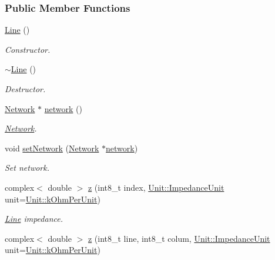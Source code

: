 \subsubsection*{Public Member Functions}
\begin{DoxyCompactItemize}
\item 
\hyperlink{group___models_gacc11b8a429d8cdd63ba6803dff5602b3}{Line} ()
\begin{DoxyCompactList}\small\item\em Constructor. \end{DoxyCompactList}\item 
\hyperlink{group___models_gaabe85f48d22d92b62257091f48174fac}{$\sim$\+Line} ()
\begin{DoxyCompactList}\small\item\em Destructor. \end{DoxyCompactList}\item 
\hyperlink{class_network}{Network} $\ast$ \hyperlink{group___models_gaa4cfa330c9c53ddaf86c8f5c17ba1ee0}{network} ()
\begin{DoxyCompactList}\small\item\em \hyperlink{class_network}{Network}. \end{DoxyCompactList}\item 
void \hyperlink{group___models_ga320766e09f0ea36b2dd07d3b1db1b72e}{set\+Network} (\hyperlink{class_network}{Network} $\ast$\hyperlink{group___models_gaa4cfa330c9c53ddaf86c8f5c17ba1ee0}{network})
\begin{DoxyCompactList}\small\item\em Set network. \end{DoxyCompactList}\item 
complex$<$ double $>$ \hyperlink{group___models_ga0b44ccb2f14635c42d7eab3fe8940692}{z} (int8\+\_\+t index, \hyperlink{class_unit_a3747e779c805df24a71961290be3fbdf}{Unit\+::\+Impedance\+Unit} unit=\hyperlink{class_unit_a3747e779c805df24a71961290be3fbdfa9327dc8628a47375d70037499f9d0910}{Unit\+::k\+Ohm\+Per\+Unit})
\begin{DoxyCompactList}\small\item\em \hyperlink{class_line}{Line} impedance. \end{DoxyCompactList}\item 
complex$<$ double $>$ \hyperlink{group___models_ga508b2db19afc02064c1afe494a25ebcc}{z} (int8\+\_\+t line, int8\+\_\+t colum, \hyperlink{class_unit_a3747e779c805df24a71961290be3fbdf}{Unit\+::\+Impedance\+Unit} unit=\hyperlink{class_unit_a3747e779c805df24a71961290be3fbdfa9327dc8628a47375d70037499f9d0910}{Unit\+::k\+Ohm\+Per\+Unit})

\end{DoxyCompactItemize}
